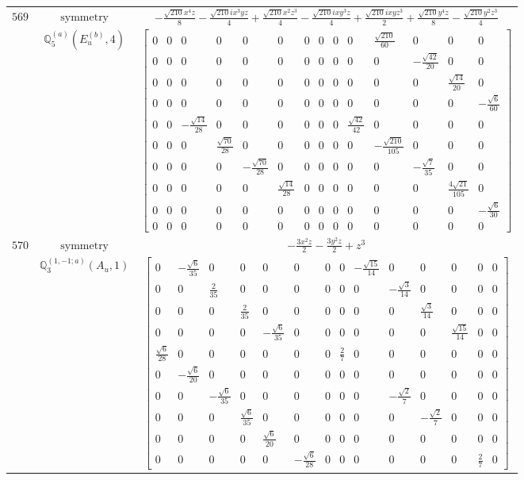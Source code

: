 \documentclass[fleqn,8pt,landscape]{jsarticle}
\begin{document}
\begin{longtable}{ccc}
$ 569 $ & $ \text{symmetry} $ & $ - \frac{\sqrt{210} x^{4} z}{8} - \frac{\sqrt{210} i x^{3} y z}{4} + \frac{\sqrt{210} x^{2} z^{3}}{4} - \frac{\sqrt{210} i x y^{3} z}{4} + \frac{\sqrt{210} i x y z^{3}}{2} + \frac{\sqrt{210} y^{4} z}{8} - \frac{\sqrt{210} y^{2} z^{3}}{4} $ \\
$  $ & $ \mathbb{Q}_{5}^{(a)}(E_{u}^{(b)},4) $ & $ \begin{bmatrix} 0 & 0 & 0 & 0 & 0 & 0 & 0 & 0 & 0 & 0 & \frac{\sqrt{210}}{60} & 0 & 0 & 0 \\ 0 & 0 & 0 & 0 & 0 & 0 & 0 & 0 & 0 & 0 & 0 & - \frac{\sqrt{42}}{20} & 0 & 0 \\ 0 & 0 & 0 & 0 & 0 & 0 & 0 & 0 & 0 & 0 & 0 & 0 & \frac{\sqrt{14}}{20} & 0 \\ 0 & 0 & 0 & 0 & 0 & 0 & 0 & 0 & 0 & 0 & 0 & 0 & 0 & - \frac{\sqrt{6}}{60} \\ 0 & 0 & - \frac{\sqrt{14}}{28} & 0 & 0 & 0 & 0 & 0 & 0 & \frac{\sqrt{42}}{42} & 0 & 0 & 0 & 0 \\ 0 & 0 & 0 & \frac{\sqrt{70}}{28} & 0 & 0 & 0 & 0 & 0 & 0 & - \frac{\sqrt{210}}{105} & 0 & 0 & 0 \\ 0 & 0 & 0 & 0 & - \frac{\sqrt{70}}{28} & 0 & 0 & 0 & 0 & 0 & 0 & - \frac{\sqrt{7}}{35} & 0 & 0 \\ 0 & 0 & 0 & 0 & 0 & \frac{\sqrt{14}}{28} & 0 & 0 & 0 & 0 & 0 & 0 & \frac{4 \sqrt{21}}{105} & 0 \\ 0 & 0 & 0 & 0 & 0 & 0 & 0 & 0 & 0 & 0 & 0 & 0 & 0 & - \frac{\sqrt{6}}{30} \\ 0 & 0 & 0 & 0 & 0 & 0 & 0 & 0 & 0 & 0 & 0 & 0 & 0 & 0 \end{bmatrix} $ \\ \hline
$ 570 $ & $ \text{symmetry} $ & $ - \frac{3 x^{2} z}{2} - \frac{3 y^{2} z}{2} + z^{3} $ \\
$  $ & $ \mathbb{Q}_{3}^{(1,-1;a)}(A_{u},1) $ & $ \begin{bmatrix} 0 & - \frac{\sqrt{6}}{35} & 0 & 0 & 0 & 0 & 0 & 0 & - \frac{\sqrt{15}}{14} & 0 & 0 & 0 & 0 & 0 \\ 0 & 0 & \frac{2}{35} & 0 & 0 & 0 & 0 & 0 & 0 & - \frac{\sqrt{3}}{14} & 0 & 0 & 0 & 0 \\ 0 & 0 & 0 & \frac{2}{35} & 0 & 0 & 0 & 0 & 0 & 0 & \frac{\sqrt{3}}{14} & 0 & 0 & 0 \\ 0 & 0 & 0 & 0 & - \frac{\sqrt{6}}{35} & 0 & 0 & 0 & 0 & 0 & 0 & \frac{\sqrt{15}}{14} & 0 & 0 \\ \frac{\sqrt{6}}{28} & 0 & 0 & 0 & 0 & 0 & 0 & \frac{2}{7} & 0 & 0 & 0 & 0 & 0 & 0 \\ 0 & - \frac{\sqrt{6}}{20} & 0 & 0 & 0 & 0 & 0 & 0 & 0 & 0 & 0 & 0 & 0 & 0 \\ 0 & 0 & - \frac{\sqrt{6}}{35} & 0 & 0 & 0 & 0 & 0 & 0 & - \frac{\sqrt{2}}{7} & 0 & 0 & 0 & 0 \\ 0 & 0 & 0 & \frac{\sqrt{6}}{35} & 0 & 0 & 0 & 0 & 0 & 0 & - \frac{\sqrt{2}}{7} & 0 & 0 & 0 \\ 0 & 0 & 0 & 0 & \frac{\sqrt{6}}{20} & 0 & 0 & 0 & 0 & 0 & 0 & 0 & 0 & 0 \\ 0 & 0 & 0 & 0 & 0 & - \frac{\sqrt{6}}{28} & 0 & 0 & 0 & 0 & 0 & 0 & \frac{2}{7} & 0 \end{bmatrix} $ \\ \hline

\end{longtable}
\end{document}
